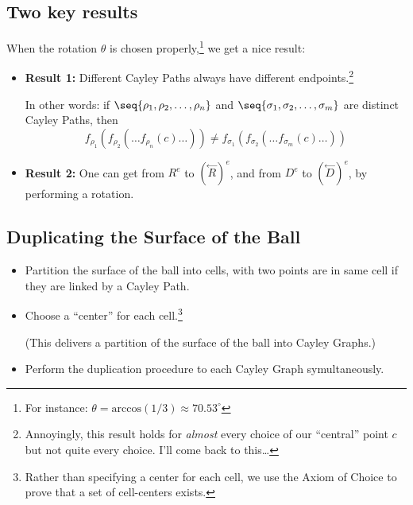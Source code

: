 \documentclass[12pt]{extarticle}
\begin{document}
\subsection{Two key results}

When the rotation \(\theta\) is chosen properly,\footnote{For instance:  \(\theta = \text{arccos}(1/3) \approx 70.53^\circ\)} we get a nice result:
\begin{itemize}


\item \textbf{Result 1:} Different Cayley Paths always have different endpoints.\footnote{Annoyingly, this result holds for \emph{almost} every choice of our ``central'' point \(c\) but not quite every choice. I'll come back to this\dots}


In other words: if \(\seq{\rho_1,\rho_2,\dots,\rho_n}\) and \(\seq{\sigma_1,\sigma_2,\dots,\sigma_m}\) are distinct Cayley Paths, then \[f_{\rho_1}(f_{\rho_2}(\dots f_{\rho_n}(c)\dots)) \neq f_{\sigma_1}(f_{\sigma_2}(\dots f_{\sigma_m}(c)\dots))\] 



\item \textbf{Result 2:} One can get from \(R^e\) to \(\left(\stackrel{\leftarrow}{R}\right)^e\), and from \(D^e\) to \(\left(\stackrel{\leftarrow}{D}\right)^e\), by performing a rotation. 
\end{itemize}





\subsection{Duplicating the Surface of the Ball}

\begin{itemize}

\item Partition the surface of the ball into cells, with two points are in same cell if they are linked by a Cayley Path. 

\item Choose a ``center'' for each cell.\footnote{Rather than specifying a center for each cell, we use the Axiom of Choice to prove that a set of cell-centers exists.} 

(This delivers a partition of the surface of the ball into Cayley Graphs.)

\item Perform the duplication procedure to each Cayley Graph symultaneously.

\end{itemize}
\end{document}
